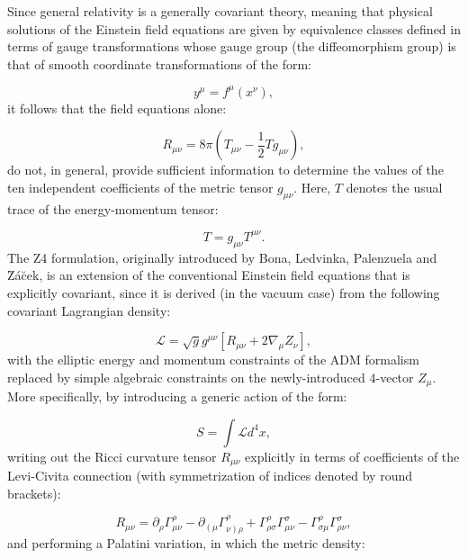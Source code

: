 \documentclass{article}
\begin{document}
Since general relativity is a generally covariant theory, meaning that physical solutions of the Einstein field equations are given by equivalence classes defined in terms of gauge transformations whose gauge group (the diffeomorphism group) is that of smooth coordinate transformations of the form:

\begin{equation}
y^{\mu} = f^{\mu} \left( x^{\nu} \right),
\end{equation}
it follows that the field equations alone:

\begin{equation}
R_{\mu \nu} = 8 \pi \left( T_{\mu \nu} - \frac{1}{2} T g_{\mu \nu} \right),
\end{equation}
do not, in general, provide sufficient information to determine the values of the ten independent coefficients of the metric tensor ${g_{\mu \nu}}$. Here, $T$ denotes the usual trace of the energy-momentum tensor:

\begin{equation}
T = g_{\mu \nu} T^{\mu \nu}.
\end{equation}
The Z4 formulation, originally introduced by Bona, Ledvinka, Palenzuela and \u{Z}\'a\u{c}ek\cite{bona2}, is an extension of the conventional Einstein field equations that is explicitly covariant, since it is derived (in the vacuum case) from the following covariant Lagrangian density\cite{bona3}:

\begin{equation}
\mathcal{L} = \sqrt{g} g^{\mu \nu} \left[ R_{\mu \nu} + 2 \nabla_{\mu} Z_{\nu} \right],
\end{equation}
with the elliptic energy and momentum constraints of the ADM formalism replaced by simple algebraic constraints on the newly-introduced 4-vector ${Z_{\mu}}$. More specifically, by introducing a generic action of the form:

\begin{equation}
S = \int \mathcal{L} d^4 x,
\end{equation}
writing out the Ricci curvature tensor ${R_{\mu \nu}}$ explicitly in terms of coefficients of the Levi-Civita connection (with symmetrization of indices denoted by round brackets):

\begin{equation}
R_{\mu \nu} = \partial_{\rho} \Gamma_{\mu \nu}^{\rho} - \partial_{\left( \mu \right.} \Gamma_{\left. \nu \right) \rho}^{\rho} + \Gamma_{\rho \sigma}^{\rho} \Gamma_{\mu \nu}^{\sigma} - \Gamma_{\sigma \mu}^{\rho} \Gamma_{\rho \nu}^{\sigma},
\end{equation}
and performing a Palatini variation, in which the metric density:
\end{document}
